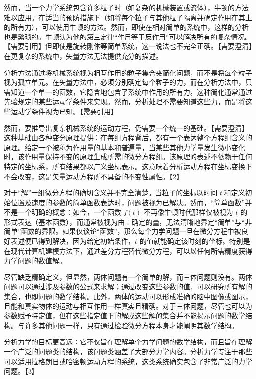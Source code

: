 然而，当一个力学系统包含许多粒子时（如复杂的机械装置或流体），牛顿的方法难以应用。在适当的预防措施下（如将每个粒子与其他粒子隔离并确定作用在其上的所有力），可以使用牛顿的方法。然而，即使在相对简单的系统中，这样的分析也是繁琐的。牛顿认为他的第三定律“作用等于反作用”可以解决所有的复杂情况。【需要引用】但即使是旋转刚体等简单系统，这一说法也不完全正确。【需要澄清】在更复杂的系统中，矢量方法无法提供充分的描述。

分析方法通过将机械系统视为相互作用的粒子集合来简化问题，而不是将每个粒子视为孤立单元。在矢量方法中，必须分别确定每个粒子的力，而在分析方法中，只需知道一个单一的函数，它隐含地包含了系统中作用的所有力。这种简化通常通过先验规定的某些运动学条件来实现。然而，分析处理不需要知道这些力，而是将这些运动学条件视为已知。【需要引用】

然而，要推导出复杂机械系统的运动方程，仍需要一个统一的基础。【需要澄清】这种基础由各种变分原理提供：在每组方程背后，都有一个表达整个方程组含义的原理。给定一个被称为作用量的基本和普遍量，当某些其他力学量发生微小变化时，该作用量保持不变的原理生成所需的微分方程组。该原理的表述不依赖于任何特定的坐标系，所有结果都以广义坐标表示。这意味着分析运动方程在坐标变换下不会改变，这是矢量运动方程所不具备的不变性属性。【2】

对于“解”一组微分方程的确切含义并不完全清楚。当粒子的坐标以时间 \( t \) 和定义初始位置及速度的参数的简单函数表达时，问题被视为已解决。然而，“简单函数”并不是一个明确的概念：如今，一个函数 \( f(t) \) 不再像牛顿时代那样仅被视为 \( t \) 的形式表达（基本函数），而通常被视为由 \( t \) 确定的量，无法清晰地界定“简单”与“非简单”函数的界限。如果仅谈论“函数”，那么每个力学问题一旦在微分方程中被良好表述便已得到解决，因为给定初始条件，\( t \) 的值就能确定该时刻的坐标。特别是在现代计算机建模方法下，通过差分方程替代微分方程，可以以任何所需精度获得力学问题的数值解。

尽管缺乏精确定义，但显然，两体问题有一个简单的解，而三体问题则没有。两体问题可以通过涉及参数的公式来求解；通过改变这些参数的值，可以研究所有解的集合，也即问题的数学结构。此外，两体的运动可以形成准确的脑中图像或图示，且能和真实物体的运动与相互作用一样真实且精确。对于三体问题，尽管也可以为参数赋予特定值，但在这些指定值下的解或这些解的集合并不能揭示问题的数学结构。与许多其他问题一样，只有通过检验微分方程本身才能阐明其数学结构。

分析力学的目标更高远：它不仅旨在理解单个力学问题的数学结构，而且旨在理解一个广泛的问题类的结构，该问题类涵盖了大部分力学内容。分析力学专注于那些可以适用拉格朗日或哈密顿运动方程的系统，这类系统确实包含了非常广泛的力学问题。【3】

